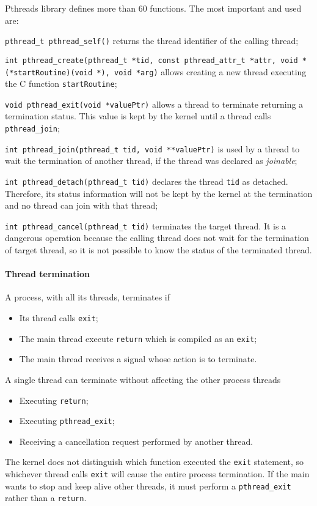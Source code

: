 Pthreads library defines more than 60 functions. The most important and used are:
\begin{description}
\item \texttt{pthread\_t pthread\_self()} returns the thread identifier of the calling thread;
\item \texttt{int pthread\_create(pthread\_t *tid, const pthread\_attr\_t *attr, \newline void *(*startRoutine)(void *), void *arg)} allows creating a new thread executing the C function \texttt{startRoutine};
\item \texttt{void pthread\_exit(void *valuePtr)} allows a thread to terminate returning a termination status. This value is kept by the kernel until a thread calls \texttt{pthread\_join};
\item \texttt{int pthread\_join(pthread\_t tid, void **valuePtr)} is used by a thread to wait the termination of another thread, if the thread was declared as \emph{joinable};
\item \texttt{int pthread\_detach(pthread\_t tid)} declares the thread \texttt{tid} as detached. Therefore, its status information will not be kept by the kernel at the termination and no thread can join with that thread;
\item \texttt{int pthread\_cancel(pthread\_t tid)} terminates the target thread. It is a dangerous operation because the calling thread does not wait for the termination of target thread, so it is not possible to know the status of the terminated thread.
\end{description}

\paragraph{Thread termination}
A process, with all its threads, terminates if
\begin{itemize}
\item Its thread calls \texttt{exit};
\item The main thread execute \texttt{return} which is compiled as an \texttt{exit};
\item The main thread receives a signal whose action is to terminate.
\end{itemize}
A single thread can terminate without affecting the other process threads
\begin{itemize}
\item Executing \texttt{return};
\item Executing \texttt{pthread\_exit};
\item Receiving a cancellation request performed by another thread.
\end{itemize}

The kernel does not distinguish which
function executed the \texttt{exit} statement, so whichever thread calls \texttt{exit} will cause the entire process termination.
If the main wants to stop and keep alive
other threads, it must perform a \texttt{pthread\_exit} rather than a \texttt{return}.
